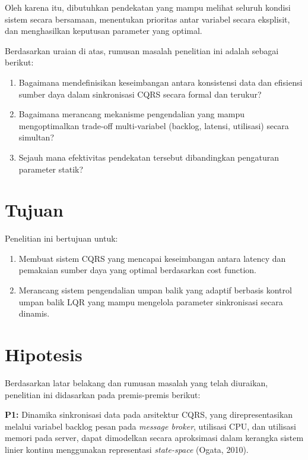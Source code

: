 Oleh karena itu, dibutuhkan pendekatan yang mampu melihat seluruh kondisi sistem secara bersamaan, menentukan prioritas antar variabel secara eksplisit, dan menghasilkan keputusan parameter yang optimal.

Berdasarkan uraian di atas, rumusan masalah penelitian ini adalah sebagai berikut:

\begin{enumerate}
\item Bagaimana mendefinisikan keseimbangan antara konsistensi data dan efisiensi sumber daya dalam sinkronisasi CQRS secara formal dan terukur?
\item Bagaimana merancang mekanisme pengendalian yang mampu mengoptimalkan trade-off multi-variabel (backlog, latensi, utilisasi) secara simultan?
\item Sejauh mana efektivitas pendekatan tersebut dibandingkan pengaturan parameter statik?
\end{enumerate}

\section{Tujuan}

Penelitian ini bertujuan untuk:

\begin{enumerate}
\item Membuat sistem CQRS yang mencapai keseimbangan antara latency dan pemakaian sumber daya yang optimal berdasarkan cost function.
\item Merancang sistem pengendalian umpan balik yang adaptif berbasis kontrol umpan balik LQR yang mampu mengelola parameter sinkronisasi secara dinamis.
\end{enumerate}

\section{Hipotesis}

Berdasarkan latar belakang dan rumusan masalah yang telah diuraikan, penelitian ini didasarkan pada premis-premis berikut:

\noindent \textbf{P1:} Dinamika sinkronisasi data pada arsitektur CQRS, yang direpresentasikan melalui variabel backlog pesan pada \emph{message broker}, utilisasi CPU, dan utilisasi memori pada server, dapat dimodelkan secara aproksimasi dalam kerangka sistem linier kontinu menggunakan representasi \emph{state-space} (Ogata, 2010).

